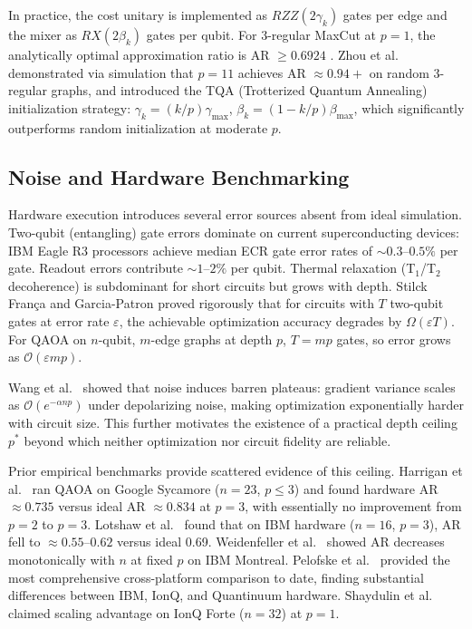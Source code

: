\documentclass[12pt]{article}
\begin{document}
In practice, the cost unitary is implemented as $RZZ(2\gamma_k)$ gates per edge and the mixer as $RX(2\beta_k)$ gates per qubit. For 3-regular MaxCut at $p = 1$, the analytically optimal approximation ratio is AR $\geq 0.6924$ \cite{farhi2014qaoa}. Zhou et al.\ \cite{zhou2020qaoa} demonstrated via simulation that $p = 11$ achieves AR $\approx 0.94+$ on random 3-regular graphs, and introduced the TQA (Trotterized Quantum Annealing) initialization strategy: $\gamma_k = (k/p)\gamma_{\max}$, $\beta_k = (1 - k/p)\beta_{\max}$, which significantly outperforms random initialization at moderate $p$.

\subsection{Noise and Hardware Benchmarking}

Hardware execution introduces several error sources absent from ideal simulation. Two-qubit (entangling) gate errors dominate on current superconducting devices: IBM Eagle R3 processors achieve median ECR gate error rates of $\sim 0.3$--$0.5\%$ per gate. Readout errors contribute $\sim 1$--$2\%$ per qubit. Thermal relaxation (T$_1$/T$_2$ decoherence) is subdominant for short circuits but grows with depth. Stilck Fran\c{c}a and Garcia-Patron \cite{stilckfranca2021limitations} proved rigorously that for circuits with $T$ two-qubit gates at error rate $\varepsilon$, the achievable optimization accuracy degrades by $\Omega(\varepsilon T)$. For QAOA on $n$-qubit, $m$-edge graphs at depth $p$, $T = mp$ gates, so error grows as $\mathcal{O}(\varepsilon m p)$.

Wang et al.\ \cite{wang2021noisebarren} showed that noise induces barren plateaus: gradient variance scales as $\mathcal{O}(e^{-\alpha n p})$ under depolarizing noise, making optimization exponentially harder with circuit size. This further motivates the existence of a practical depth ceiling $p^*$ beyond which neither optimization nor circuit fidelity are reliable.

Prior empirical benchmarks provide scattered evidence of this ceiling. Harrigan et al.\ \cite{harrigan2021quantum} ran QAOA on Google Sycamore ($n = 23$, $p \leq 3$) and found hardware AR $\approx 0.735$ versus ideal AR $\approx 0.834$ at $p = 3$, with essentially no improvement from $p = 2$ to $p = 3$. Lotshaw et al.\ \cite{lotshaw2021empirical} found that on IBM hardware ($n = 16$, $p = 3$), AR fell to $\approx 0.55$--$0.62$ versus ideal 0.69. Weidenfeller et al.\ \cite{weidenfeller2022scaling} showed AR decreases monotonically with $n$ at fixed $p$ on IBM Montreal. Pelofske et al.\ \cite{pelofske2022quantum} provided the most comprehensive cross-platform comparison to date, finding substantial differences between IBM, IonQ, and Quantinuum hardware. Shaydulin et al.\ \cite{shaydulin2023evidence} claimed scaling advantage on IonQ Forte ($n = 32$) at $p = 1$.
\end{document}
